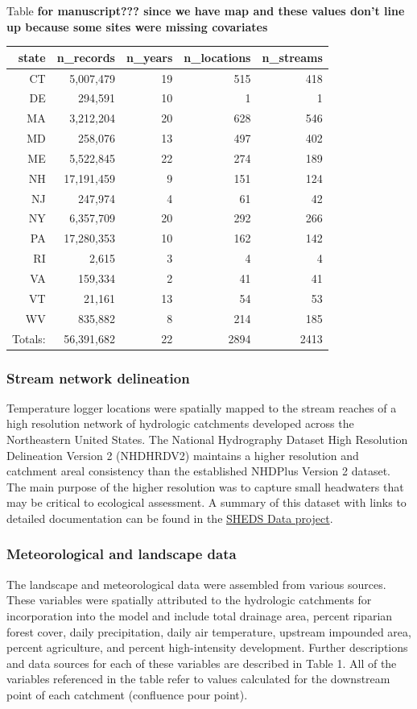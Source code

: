 Table \textbf{for manuscript??? since we have map and these values don't
line up because some sites were missing covariates}

\begin{longtable}[]{@{}rrrrr@{}}
\toprule
state & n\_records & n\_years & n\_locations & n\_streams\tabularnewline
\midrule
\endhead
CT & 5,007,479 & 19 & 515 & 418\tabularnewline
DE & 294,591 & 10 & 1 & 1\tabularnewline
MA & 3,212,204 & 20 & 628 & 546\tabularnewline
MD & 258,076 & 13 & 497 & 402\tabularnewline
ME & 5,522,845 & 22 & 274 & 189\tabularnewline
NH & 17,191,459 & 9 & 151 & 124\tabularnewline
NJ & 247,974 & 4 & 61 & 42\tabularnewline
NY & 6,357,709 & 20 & 292 & 266\tabularnewline
PA & 17,280,353 & 10 & 162 & 142\tabularnewline
RI & 2,615 & 3 & 4 & 4\tabularnewline
VA & 159,334 & 2 & 41 & 41\tabularnewline
VT & 21,161 & 13 & 54 & 53\tabularnewline
WV & 835,882 & 8 & 214 & 185\tabularnewline
Totals: & 56,391,682 & 22 & 2894 & 2413\tabularnewline
\bottomrule
\end{longtable}

\subsubsection{Stream network
delineation}\label{stream-network-delineation}

Temperature logger locations were spatially mapped to the stream reaches
of a high resolution network of hydrologic catchments developed across
the Northeastern United States. The National Hydrography Dataset High
Resolution Delineation Version 2 (NHDHRDV2) maintains a higher
resolution and catchment areal consistency than the established NHDPlus
Version 2 dataset. The main purpose of the higher resolution was to
capture small headwaters that may be critical to ecological assessment.
A summary of this dataset with links to detailed documentation can be
found in the \href{http://conte-ecology.github.io/shedsGISData/}{SHEDS
Data project}.

\subsubsection{Meteorological and landscape
data}\label{meteorological-and-landscape-data}

The landscape and meteorological data were assembled from various
sources. These variables were spatially attributed to the hydrologic
catchments for incorporation into the model and include total drainage
area, percent riparian forest cover, daily precipitation, daily air
temperature, upstream impounded area, percent agriculture, and percent
high-intensity development. Further descriptions and data sources for
each of these variables are described in Table 1. All of the variables
referenced in the table refer to values calculated for the downstream
point of each catchment (confluence pour point).

